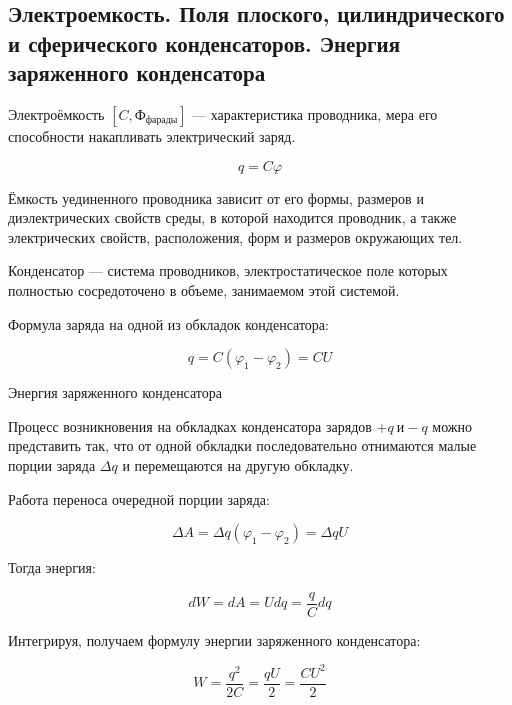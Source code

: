 \subsection{Электроемкость. Поля плоского, цилиндрического и сферического конденсаторов. Энергия заряженного конденсатора}

\begin{definition}
    Электроёмкость $[C, Ф_{фарады}]$ — характеристика проводника, мера его способности накапливать электрический заряд.

    $$
    q=C\varphi
    $$
\end{definition}

Ёмкость уединенного проводника зависит от его формы, размеров и диэлектрических свойств среды, в которой находится проводник, 
а также электрических свойств, расположения, форм и размеров окружающих тел.

\begin{definition}
    Конденсатор — система проводников, электростатическое поле которых полностью сосредоточено в объеме, занимаемом этой системой.

    Формула заряда на одной из обкладок конденсатора:

    $$
    q=C(\varphi_1-\varphi_2)=CU
    $$
\end{definition}


\begin{definition}
    Энергия заряженного конденсатора

Процесс возникновения на обкладках конденсатора зарядов $+q\ и -q$ можно представить так, что от одной обкладки последовательно отнимаются 
малые порции заряда $\Delta q$ и перемещаются на другую обкладку.
\end{definition}

Работа переноса очередной порции заряда:

$$
\Delta A=\Delta q(\varphi_1-\varphi_2)=\Delta qU
$$

Тогда энергия:

$$
dW=dA=Udq=\frac{q}{C}dq
$$

Интегрируя, получаем формулу энергии заряженного конденсатора:

$$
W=\frac{q^2}{2C}=\frac{qU}{2}=\frac{CU^2}{2}
$$

